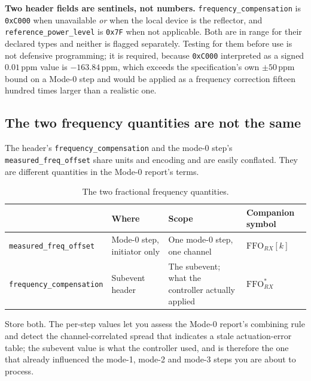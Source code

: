 \documentclass[11pt,a4paper]{article}
\newcommand{\code}[1]{\texttt{\small #1}}
\newcommand{\FFO}{\ensuremath{\mathrm{FFO}}}
\begin{document}
\begin{caution}
\textbf{Two header fields are sentinels, not numbers.} \code{frequency\_\allowbreak{}compensation} is
\code{0xC000} when unavailable \emph{or} when the local device is the reflector, and
\code{reference\_\allowbreak{}power\_\allowbreak{}level} is \code{0x7F} when not applicable. Both are in range for their
declared types and neither is flagged separately. Testing for them before use is not defensive
programming; it is required, because \code{0xC000} interpreted as a signed $0.01$\,ppm value is
$-163.84$\,ppm, which exceeds the specification's own $\pm50$\,ppm bound on a Mode-0 step and would
be applied as a frequency correction fifteen hundred times larger than a realistic one.
\end{caution}

\subsection{The two frequency quantities are not the same}

The header's \code{frequency\_\allowbreak{}compensation} and the mode-0 step's \code{measured\_\allowbreak{}freq\_\allowbreak{}offset} share
units and encoding and are easily conflated. They are different quantities in the Mode-0 report's
terms.

\begin{table}[h]
\caption{The two fractional frequency quantities.}
\label{tab:twofreq}
\centering\small
\begin{tabular}{@{}L{34mm}L{40mm}L{30mm}L{34mm}@{}}
\toprule
 & Where & Scope & Companion symbol \\
\midrule
\code{measured\_\allowbreak{}freq\_\allowbreak{}offset} & Mode-0 step, initiator only & One mode-0 step, one channel & $\FFO_{RX}[k]$ \\
\code{frequency\_\allowbreak{}compensation} & Subevent header & The subevent; what the controller actually applied & $\FFO^{*}_{RX}$ \\
\bottomrule
\end{tabular}
\end{table}

Store both. The per-step values let you assess the Mode-0 report's combining rule and detect the
channel-correlated spread that indicates a stale actuation-error table; the subevent value is what
the controller used, and is therefore the one that already influenced the mode-1, mode-2 and mode-3
steps you are about to process.
\end{document}
